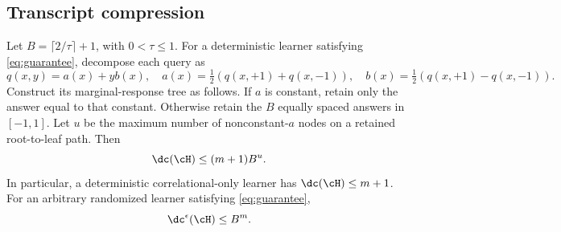 \subsection{Transcript compression}
\begin{theorem}\label{thm:tree}
Let $B=\lceil2/\tau\rceil+1$, with $0<\tau\leq1$. For a deterministic learner satisfying \eqref{eq:guarantee}, decompose each query as
\[
 q(x,y)=a(x)+yb(x),\quad
 a(x)=\tfrac12(q(x,+1)+q(x,-1)),\quad
 b(x)=\tfrac12(q(x,+1)-q(x,-1)).
\]
Construct its marginal-response tree as follows. If $a$ is constant, retain only the answer equal to that constant. Otherwise retain the $B$ equally spaced answers in $[-1,1]$. Let $u$ be the maximum number of nonconstant-$a$ nodes on a retained root-to-leaf path. Then
\begin{equation}\label{eq:tree}
 \dc(\cH)\leq(m+1)B^u.
\end{equation}
In particular, a deterministic correlational-only learner has $\dc(\cH)\leq m+1$.
For an arbitrary randomized learner satisfying \eqref{eq:guarantee},
\begin{equation}\label{eq:approx}
 \dc^{\epsilon}(\cH)\leq B^m.
\end{equation}
\end{theorem}
